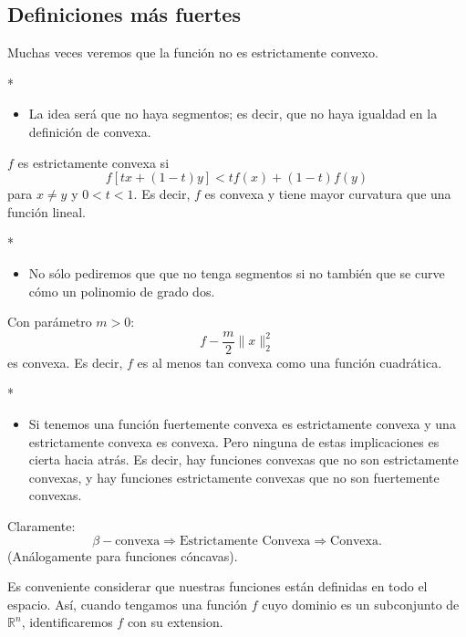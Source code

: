 \begin{paracol}{2}
\subsection{Definiciones más fuertes}

Muchas veces veremos que la función no es estrictamente convexo.


\switchcolumn[1]*{\noindent\scriptsize
	\begin{itemize}
	    \item La idea será que no haya segmentos; es decir, que no haya igualdad en la definición de convexa.
	\end{itemize}
}
\switchcolumn[0]\noindent
\begin{def.} $f$ es estrictamente convexa si
	$$f\left[tx+(1-t)y\right]< tf(x)+(1-t)f(y)$$
	para $x\neq y$ y $0<t<1$. Es decir, $f$ es convexa y tiene mayor curvatura que una función lineal.
\end{def.}

\switchcolumn[1]*{\noindent\scriptsize
	\begin{itemize}
	    \item No sólo pediremos que que no tenga segmentos si no también que se curve cómo un polinomio de grado dos.
	\end{itemize}
}
\switchcolumn[0]\noindent
\begin{def.} Con parámetro $m>0$:
    $$f-\dfrac{m}{2}\|x\|^2_2$$
    es convexa. Es decir, $f$ es al menos tan convexa como una función cuadrática.
\end{def.}

\switchcolumn[1]*{\noindent\scriptsize
	\begin{itemize}
	    \item Si tenemos una función fuertemente convexa es estrictamente convexa y una estrictamente convexa es convexa. Pero ninguna de estas implicaciones es cierta hacia atrás. Es decir, hay funciones convexas que no son estrictamente convexas, y hay funciones estrictamente convexas que no son fuertemente convexas.
	\end{itemize}
}
\switchcolumn[0]\noindent
\begin{tcolorbox}[colframe=white]
    Claramente:
    $$\beta-\text{convexa}\Rightarrow \text{Estrictamente Convexa} \Rightarrow \text{Convexa}.$$
    (Análogamente para funciones cóncavas).
\end{tcolorbox}

\begin{tcolorbox}[colframe=white]
    Es conveniente considerar que nuestras funciones están definidas en todo el espacio. Así, cuando tengamos una función $f$ cuyo dominio es un subconjunto de $\mathbb{R}^n$, identificaremos $f$ con su extension.
\end{tcolorbox}




\end{paracol}
